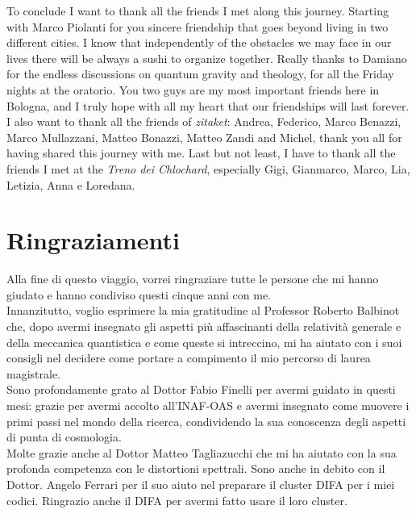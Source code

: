 To conclude I want to thank all the friends I met along this journey. Starting with Marco Piolanti for you sincere friendship that goes beyond living in two different cities. I know that independently of the obstacles we may face in our lives there will be always a sushi to organize together. Really thanks to Damiano for the endless discussions on quantum gravity and theology, for all the Friday nights at the oratorio. You two guys are my most important friends here in Bologna, and I truly hope with all my heart that our friendships will last forever. I also want to thank all the friends of \emph{zitaket}: Andrea, Federico, Marco Benazzi, Marco Mullazzani, Matteo Bonazzi, Matteo Zandi and Michel, thank you all for having shared this journey with me. Last but not least, I have to thank all the friends I met at the \emph{Treno dei Chlochard}, especially Gigi, Gianmarco, Marco, Lia, Letizia, Anna e Loredana. 

\newpage
\section*{Ringraziamenti}
Alla fine di questo viaggio, vorrei ringraziare tutte le persone che mi hanno giudato e hanno condiviso questi cinque anni con me.\\
Innanzitutto, voglio esprimere la mia gratitudine al Professor Roberto Balbinot che, dopo avermi insegnato gli aspetti più affascinanti della relatività generale e della meccanica quantistica e come queste si intreccino, mi ha aiutato con i suoi consigli nel decidere come portare a compimento il mio percorso di laurea magistrale.\\
Sono profondamente grato al Dottor Fabio Finelli per avermi guidato in questi mesi: grazie per avermi accolto all'INAF-OAS e avermi insegnato come muovere i primi passi nel mondo della ricerca, condividendo la sua conoscenza degli aspetti di punta di cosmologia.\\
Molte grazie anche al Dottor Matteo Tagliazucchi che mi ha aiutato con la sua profonda competenza con le distortioni spettrali. Sono anche in debito con il Dottor. Angelo Ferrari per il suo aiuto nel preparare il cluster DIFA per i miei codici. Ringrazio anche il DIFA per avermi fatto usare il loro cluster.

